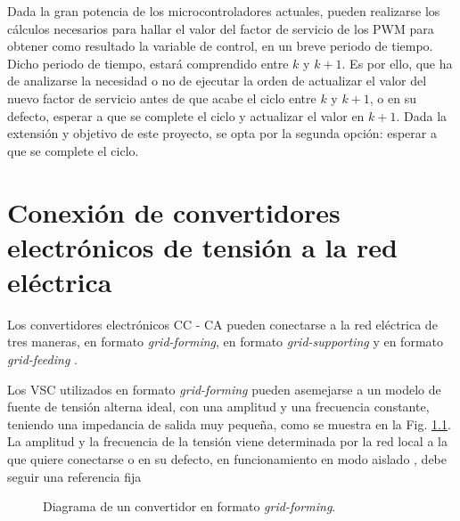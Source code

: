 \documentclass{report}
\begin{document}
Dada la gran potencia de los microcontroladores actuales, pueden realizarse los cálculos necesarios para hallar el valor del factor de servicio de los PWM para obtener como resultado la variable de control, en un breve periodo de tiempo. Dicho periodo de tiempo, estará comprendido entre $k$ y $k+1$. Es por ello, que ha de analizarse la necesidad o no de ejecutar la orden de actualizar el valor del nuevo factor de servicio antes de que acabe el ciclo entre $k$ y $k+1$, o en su defecto, esperar a que se complete el ciclo y actualizar el valor en $k+1$. Dada la extensión y objetivo de este proyecto, se opta por la segunda opción: esperar a que se complete el ciclo.
\clearpage

\chapter{Conexión de convertidores electrónicos de tensión a la red eléctrica} \label{sec.conexiondeconvertidoresaredelectrica}



Los convertidores electrónicos CC - CA pueden conectarse a la red eléctrica de tres maneras, en formato \textit{grid-forming}, en formato \textit{grid-supporting} y en formato \textit{grid-feeding} \cite{dos}.

Los VSC utilizados en formato \textit{grid-forming} pueden asemejarse a un modelo de fuente de tensión alterna ideal, con una amplitud y una frecuencia constante, teniendo una impedancia de salida muy pequeña, como se muestra en la Fig. \ref{fig.grid-forming-diagram}. La amplitud y la frecuencia de la tensión viene determinada por la red local a la que quiere conectarse \cite{dos} o en su defecto, en funcionamiento en modo aislado \cite{treintaysiete}, debe seguir una referencia fija \cite{ocho}
    

\begin{figure}[!h]
    \begin{center}
    \end{center}
    \caption{Diagrama de un convertidor en formato \textit{grid-forming}\cite{nueve}.}
    \label{fig.grid-forming-diagram}
    \end{figure}
\end{document}

